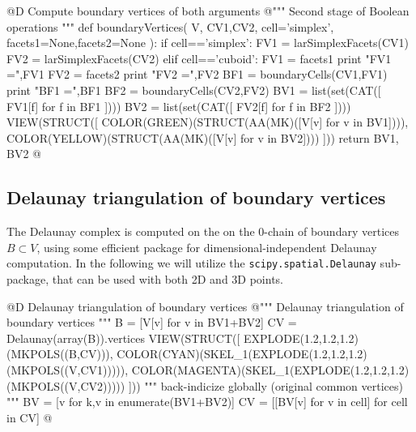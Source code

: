 \documentclass[11pt,oneside]{article}	%
\begin{document}
@D Compute boundary vertices of both arguments
@{""" Second stage of Boolean operations """
def boundaryVertices( V, CV1,CV2, cell='simplex', facets1=None,facets2=None ):
	if cell=='simplex': 
		FV1 = larSimplexFacets(CV1)
		FV2 = larSimplexFacets(CV2)
	elif cell=='cuboid': 
		FV1 = facets1
		print "\n FV1 =",FV1
		FV2 = facets2
		print "\n FV2 =",FV2
	BF1 = boundaryCells(CV1,FV1)
	print "\n BF1 =",BF1
	BF2 = boundaryCells(CV2,FV2)
	BV1 = list(set(CAT([ FV1[f] for f in BF1 ])))
	BV2 = list(set(CAT([ FV2[f] for f in BF2 ])))
	VIEW(STRUCT([ 
		COLOR(GREEN)(STRUCT(AA(MK)([V[v] for v in BV1]))), 
		COLOR(YELLOW)(STRUCT(AA(MK)([V[v] for v in BV2]))) ]))
	return BV1, BV2
@}
\subsection{Delaunay triangulation of boundary vertices}

The Delaunay complex is computed on the on the 0-chain of boundary vertices $B\subset V$, using some efficient package for dimensional-independent Delaunay computation. In the following  we will utilize the \texttt{scipy.spatial.Delaunay} sub-package, that can be used with both 2D and 3D points. 

@D Delaunay triangulation of boundary vertices
@{""" Delaunay triangulation of boundary vertices """
B = [V[v] for v in BV1+BV2]
CV = Delaunay(array(B)).vertices
VIEW(STRUCT([
	EXPLODE(1.2,1.2,1.2)(MKPOLS((B,CV))),
	COLOR(CYAN)(SKEL_1(EXPLODE(1.2,1.2,1.2)(MKPOLS((V,CV1))))),
	COLOR(MAGENTA)(SKEL_1(EXPLODE(1.2,1.2,1.2)(MKPOLS((V,CV2)))))
]))
""" back-indicize globally (original common vertices) """
BV = [v for k,v in enumerate(BV1+BV2)]
CV = [[BV[v] for v in cell] for cell in CV]
@}
\end{document}
